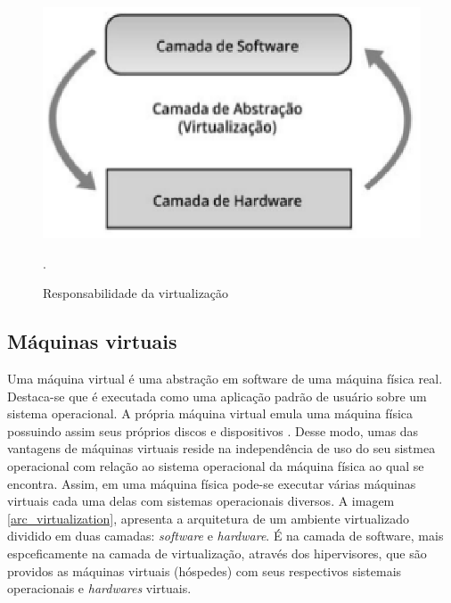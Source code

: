 \begin{figure}[!htb]
\centering
\includegraphics [keepaspectratio=true,scale=0.60]{figuras/virtualization_role.eps}
\caption{Responsabilidade da virtualização}
\cite{manoel}.
\label{virtualization_role}
\end{figure}

\subsection{Máquinas virtuais}
Uma máquina virtual é uma abstração em software de uma máquina física real. Destaca-se que é executada como uma aplicação padrão de usuário sobre um sistema operacional. A própria máquina virtual emula uma máquina física possuindo assim seus próprios discos e dispositivos \cite{mcewan}. Desse modo, umas das vantagens de máquinas virtuais reside na independência de uso do seu sistmea operacional com relação ao sistema operacional da máquina física ao qual se encontra. Assim, em uma máquina física pode-se executar várias máquinas virtuais cada uma delas com sistemas operacionais diversos. A imagem \ref{arc_virtualization}, apresenta a arquitetura de um ambiente virtualizado dividido em duas camadas: \textit{software} e \textit{hardware}. É na camada de software, mais espceficamente na camada de virtualização, através dos hipervisores, que são providos as máquinas virtuais (hóspedes) com seus respectivos sistemais operacionais e \textit{hardwares} virtuais.  

